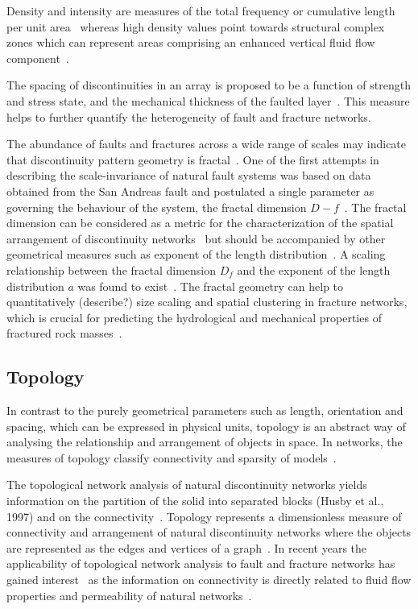 \documentclass[a4paper,fleqn]{cas-sc}
\begin{document}
Density and intensity are measures of the total frequency or cumulative length per unit area~\citep{Rohrbaugh2002, Zeeb2013, Watkins2015} whereas high density values point towards structural complex zones which can represent areas comprising an enhanced vertical fluid flow component~\citep{Dimmen2017}. 

The spacing of discontinuities in an array is proposed to be a function of strength and stress state, and the mechanical thickness of the faulted layer~\citep{Soliva2006, Zusa2017, Yang2020}. This measure helps to further quantify the heterogeneity of fault and fracture networks.

The abundance of faults and fractures across a wide range of scales may indicate that discontinuity pattern geometry is fractal~\citep[and references therein]{Bour1999}. One of the first attempts in describing the scale-invariance of natural fault systems was based on data obtained from the San Andreas fault and postulated a single parameter as governing the behaviour of the system, the fractal dimension $D-f$~\citep{Turcotte1986}. The fractal dimension can be considered as a metric for the characterization of the spatial arrangement of discontinuity networks~\citep{Walsh1993, Idziak1996, Roy2007} but should be accompanied by other geometrical  measures such as exponent of the length distribution~\citep{Bonnet2001}. A scaling relationship between the fractal dimension $D_f$ and the exponent of the length distribution $a$ was found to exist~\citep{Bour1999}. The fractal geometry can help to quantitatively (describe?) size scaling and spatial clustering in fracture networks, which is crucial for predicting the hydrological and mechanical properties of fractured rock masses~\citep{Barton1995, Liu2017}.  

\subsection{Topology}
In contrast to the purely geometrical parameters such as length, orientation and spacing, which can be expressed in physical units, topology is an abstract way of analysing the relationship and arrangement of objects in space. In networks, the measures of topology classify connectivity and sparsity of models~\citep{Kincaid2011}.

The topological network analysis of natural discontinuity networks yields information on the partition of the solid into separated blocks (Husby et al., 1997) and on the connectivity~\citep{Andresen2013}. Topology represents a dimensionless measure of connectivity and arrangement of natural discontinuity networks where the objects are represented as the edges and vertices of a graph~\citep{Morley2016, Sanderson2019}. In recent years the applicability of topological network analysis to fault and fracture networks has gained interest~\citep{Sanderson2019, Nyberg2019} as the information on connectivity is directly related to fluid flow properties and permeability of natural networks~\citep{Manzocchi2002, Renard2013}.
\end{document}
